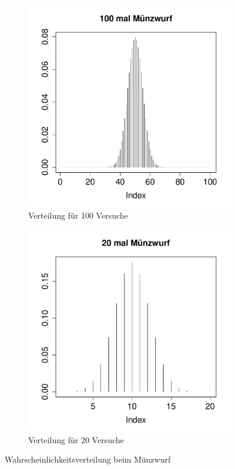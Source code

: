 \begin{figure}[h!]
\centering
\begin{subfigure}[b]{0.48\textwidth}
\includegraphics{verteilungen-017}
\caption{Verteilung für 100 Versuche}
\end{subfigure}
\begin{subfigure}[b]{0.48\textwidth}
\includegraphics{verteilungen-018}
\caption{Verteilung für 20 Versuche}
\end{subfigure}
\caption{Wahrscheinlichkeitsverteilung beim Münzwurf}
\end{figure}

